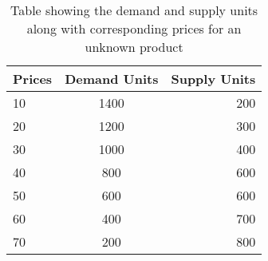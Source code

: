 \documentclass[table]{article}
\begin{document}
\begin{table}[h]
    \begin{center}
        \begin{tabular}{l|c|r}
            \textbf{Prices} & \textbf{Demand Units} & \textbf{Supply Units} \\
            \hline
            10              & 1400                  & 200                   \\
            20              & 1200                  & 300                   \\
            30              & 1000                  & 400                   \\
            40              & 800                   & 600                   \\
            \rowcolor{green}
            50              & 600                   & 600                   \\
            60              & 400                   & 700                   \\
            70              & 200                   & 800                   \\
        \end{tabular}
    \end{center}
    \caption{\label{tab:table-1} Table showing the demand and supply units along with corresponding prices for an unknown product}
\end{table}
\end{document}

